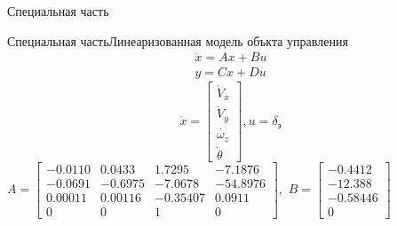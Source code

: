 
\begin{frame}{Специальная часть}
\end{frame}
\begin{frame}{Специальная часть}{Линеаризованная модель объкта управления}
    \begin{equation} \begin{aligned} \dot{x} = Ax+Bu \\ 
    y = Cx + Du \end{aligned} \end{equation}
$$\dot{x} = \begin{bmatrix}
        \dot{V}_x\\ 
        \dot{V}_y\\ 
        \dot{\omega_z}\\ 
        \dot{\theta}
    \end{bmatrix},
u = \delta_\text{э}$$
   $ A = \begin{bmatrix}
        -0.0110 & 0.0433 & 1.7295 & -7.1876\\ 
        -0.0691 & -0.6975 & -7.0678 & -54.8976\\ 
        0.00011 & 0.00116 & -0.35407 & 0.0911\\ 
        0 & 0 & 1 & 0
    \end{bmatrix} ,$  
        $B = \begin{bmatrix}
        -0.4412\\ 
        -12.388\\ 
        -0.58446 \\ 
        0
    \end{bmatrix}$  
\end{frame}


